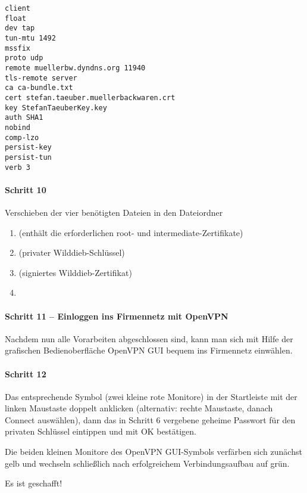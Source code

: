 \begin{lstlisting}
client
float
dev tap
tun-mtu 1492
mssfix
proto udp
remote muellerbw.dyndns.org 11940
tls-remote server
ca ca-bundle.txt
cert stefan.taeuber.muellerbackwaren.crt
key StefanTaeuberKey.key
auth SHA1
nobind
comp-lzo
persist-key
persist-tun
verb 3
\end{lstlisting}

\paragraph{Schritt 10}

Verschieben der vier benötigten Dateien in den Dateiordner

\begin{enumerate}
  \item {} (enthält die erforderlichen root- und intermediate-Zertifikate)
  \item {} (privater \glqq{}Wilddieb-Schlüssel\grqq{})
  \item {} (signiertes \glqq{}Wilddieb-Zertifikat\grqq{})
  \item {} 
\end{enumerate}

\paragraph{Schritt 11 -- Einloggen ins Firmennetz mit OpenVPN}

Nachdem nun alle Vorarbeiten abgeschlossen sind, kann man sich mit Hilfe der
grafischen Bedienoberfläche OpenVPN GUI bequem ins Firmennetz einwählen.

\paragraph{Schritt 12}

Das entsprechende Symbol (zwei kleine rote Monitore) in der Startleiste mit der
linken Maustaste doppelt anklicken (alternativ: rechte Maustaste, danach
\glqq{}Connect\grqq{} auswählen), dann das in Schritt 6 vergebene geheime Passwort für den
privaten Schlüssel eintippen und mit \glqq{}OK\grqq{} bestätigen.

Die beiden kleinen Monitore des OpenVPN GUI-Symbols verfärben sich zunächst gelb
und wechseln schließlich nach erfolgreichem Verbindungsaufbau auf grün.

Es ist geschafft!

